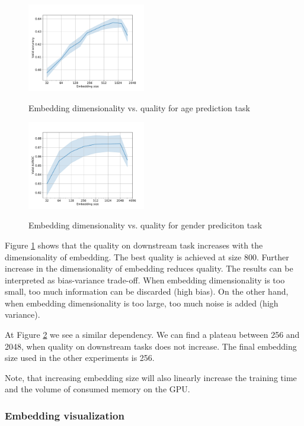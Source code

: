\documentclass[sigconf, anonymous]{acmart}
\begin{document}
\begin{figure}[h]
  \caption{Embedding dimensionality vs. quality for age prediction task}
  \includegraphics[width=0.46\textwidth]{figures/age-pred-hidden-size.pdf}
  \label{fig-emb-dim-age}
\end{figure}

\begin{figure}[h]
  \caption{Embedding dimensionality vs. quality for gender prediciton task}
  \includegraphics[width=0.46\textwidth]{figures/gender-hidden-size.pdf}
  \label{fig-emb-dim-gender}
\end{figure}

Figure \ref{fig-emb-dim-age} shows that the quality on downstream task increases with the dimensionality of embedding. The best quality is achieved at size 800. Further increase in the dimensionality of embedding reduces quality.
The results can be interpreted as bias-variance trade-off. When embedding dimensionality is too small, too much information can be discarded (high bias). On the other hand, when embedding dimensionality is too large, too much noise is added (high variance).

At Figure \ref{fig-emb-dim-gender} we see a similar dependency. We can find a plateau between 256 and 2048, when quality on downstream tasks does not increase. The final embedding size used in the other experiments is 256.

Note, that increasing embedding size will also linearly increase the training time and the volume of consumed memory on the GPU.

\subsubsection{Embedding visualization}
\end{document}
